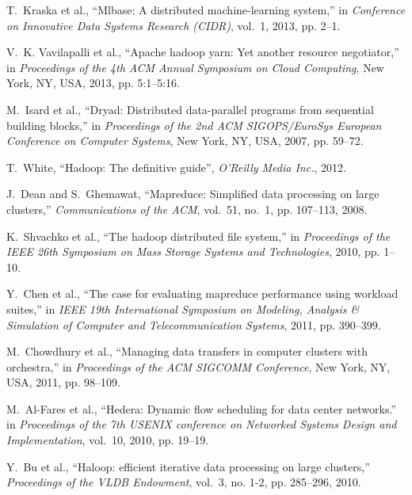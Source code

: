 \documentclass[10pt,journal,compsoc]{IEEEtran}
\begin{document}
\begin{thebibliography}{43}
T.~Kraska et al., ``Mlbase: A distributed machine-learning system,'' in
  \emph{Conference on Innovative Data Systems Research (CIDR)}, vol.~1, 2013,
  pp. 2--1.

V.~K. Vavilapalli et al., ``Apache hadoop yarn: Yet another
  resource negotiator,'' in \emph{Proceedings of the 4th ACM Annual Symposium
  on Cloud Computing}, New York, NY, USA, 2013, pp. 5:1--5:16.


M.~Isard et al., ``Dryad: Distributed
  data-parallel programs from sequential building blocks,'' in
  \emph{Proceedings of the 2nd ACM SIGOPS/EuroSys European Conference on
  Computer Systems}, New York, NY, USA, 2007, pp. 59--72.

T.~White, ``Hadoop: The definitive guide'', \emph{O'Reilly Media Inc.}, 2012.

J.~Dean and S.~Ghemawat, ``Mapreduce: Simplified data processing on large
  clusters,'' \emph{Communications of the ACM}, vol.~51, no.~1, pp. 107--113,
  2008.

K.~Shvachko et al., ``The hadoop distributed file
  system,'' in \emph{Proceedings of the IEEE 26th Symposium on Mass Storage
  Systems and Technologies}, 2010,
  pp. 1--10.

Y.~Chen et al., ``The case for evaluating
  mapreduce performance using workload suites,'' in \emph{IEEE 19th
  International Symposium on Modeling, Analysis \& Simulation of Computer and
  Telecommunication Systems}, 2011, pp. 390--399.

M.~Chowdhury et al., ``Managing data
  transfers in computer clusters with orchestra,'' in \emph{Proceedings of the
  ACM SIGCOMM Conference}, New York, NY,
  USA, 2011, pp. 98--109.

M.~Al-Fares et al., ``Hedera:
  Dynamic flow scheduling for data center networks.'' in \emph{Proceedings of
  the 7th USENIX conference on Networked Systems Design and Implementation},
  vol.~10, 2010, pp. 19--19.

Y.~Bu et al., ``Haloop: efficient iterative
  data processing on large clusters,'' \emph{Proceedings of the VLDB
  Endowment}, vol.~3, no. 1-2, pp. 285--296, 2010.


\end{thebibliography}
\end{document}
